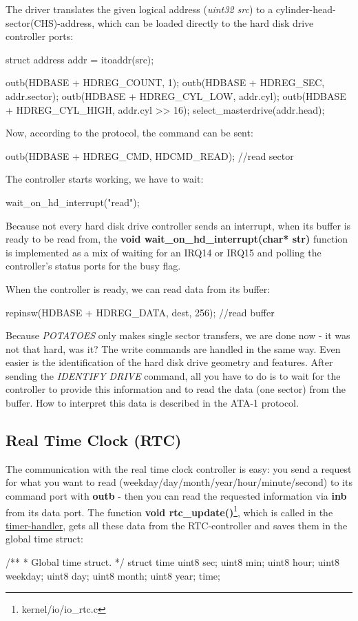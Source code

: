 \documentclass[11pt,a4paper]{scrartcl}
\begin{document}
The driver translates the given logical address (\textit{uint32 src}) to a cylinder-head-sector(CHS)-address, which can be loaded directly to the hard disk drive controller ports:
\begin{code}
	struct address addr = itoaddr(src);

	outb(HDBASE + HDREG_COUNT, 1);
	outb(HDBASE + HDREG_SEC, addr.sector);
	outb(HDBASE + HDREG_CYL_LOW, addr.cyl);
	outb(HDBASE + HDREG_CYL_HIGH, addr.cyl >> 16);
	select_masterdrive(addr.head);
\end{code}
Now, according to the protocol, the command can be sent:
\begin{code}
	outb(HDBASE + HDREG_CMD, HDCMD_READ); //read sector
\end{code}
The controller starts working, we have to wait:
\begin{code}
	wait_on_hd_interrupt("read");
\end{code}
Because not every hard disk drive controller sends an interrupt, when its buffer is ready to be read from, the \textbf{void wait\_on\_hd\_interrupt(char* str)} function is implemented as a mix of waiting for an IRQ14 or IRQ15 and polling the controller's status ports for the busy flag.

When the controller is ready, we can read data from its buffer:
\begin{code}
	repinsw(HDBASE + HDREG_DATA, dest, 256); //read buffer
\end{code}
Because \textit{POTATOES} only makes single sector transfers, we are done now - it was not that hard, was it? The write commands are handled in the same way. Even easier is the identification of the hard disk drive geometry and features. After sending the \textit{IDENTIFY DRIVE} command, all you have to do is to wait for the controller to provide this information and to read the data (one sector) from the buffer. How to interpret this data is described in the ATA-1 protocol.
\subsection{Real Time Clock (RTC)}
\hypertarget{RTC}{}
The communication with the real time clock controller is easy: you send a request for what you want to read (weekday/day/month/year/hour/minute/second) to its command port with \textbf{outb} - then you can read the requested information via \textbf{inb} from its data port. The function \textbf{void rtc\_update()}\footnote{kernel/io/io\_rtc.c}, which is called in the \hyperlink{TIMER}{timer-handler}, gets all these data from the RTC-controller and saves them in the global time struct:
\begin{code}
/**
 * Global time struct.
 */
struct time {
	uint8 sec;
	uint8 min;
	uint8 hour;
	uint8 weekday;
	uint8 day;
	uint8 month;
	uint8 year;
}time;
\end{code}
\end{document}
